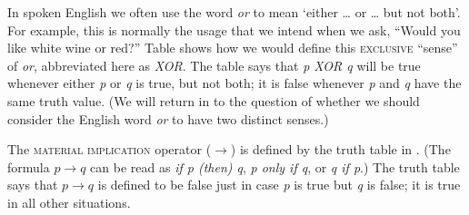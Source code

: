 \begin{sloppypar}
In spoken English we often use the word \textit{or} to mean ‘either … or … but not both’. For example, this is normally the usage that we intend when we ask, “Would you like white wine or red?” Table  shows how we would define this \textsc{exclusive} “sense” of \textit{or}, abbreviated here as \textit{XOR}. The table says that \textit{p XOR q} will be true whenever either \textit{p} or \textit{q} is true, but not both; it is false whenever \textit{p} and \textit{q} have the same truth value. (We will return in  to the question of whether we should consider the English word \textit{or} to have two distinct senses.)
\end{sloppypar}



The \textsc{material} \textsc{implication} operator ($\rightarrow$) is defined by the truth table in . (The formula $p \rightarrow q$ can be read as \textit{if p (then) q}, \textit{p only if q}, or \textit{q if p}.) The truth table says that $p \rightarrow q$ is defined to be false just in case \textit{p} is true but \textit{q} is false; it is true in all other situations.



